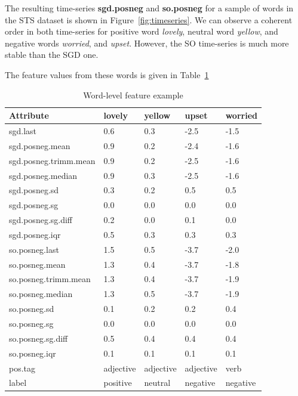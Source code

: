 \documentclass{sig-alternate}
\begin{document}
The resulting time-series \textbf{sgd.posneg} and \textbf{so.posneg} for a sample of words in the STS dataset is shown in Figure~\ref{fig:timeseries}. We can observe a coherent order in both time-series for positive word \emph{lovely}, neutral word \emph{yellow}, and  negative words \emph{worried}, and \emph{upset}. However, the SO time-series is much more stable than the SGD one. 


The feature values from these words is given in Table~\ref{fig:featex}

\begin{table}[ht]
\footnotesize
\centering
\begin{tabular}{l|llll}
  \hline
Attribute & lovely & yellow & upset & worried \\ 
  \hline
sgd.last &  0.6 &  0.3 & -2.5 & -1.5 \\ 
  sgd.posneg.mean &  0.9 &  0.2 & -2.4 & -1.6 \\ 
  sgd.posneg.trimm.mean &  0.9 &  0.2 & -2.5 & -1.6 \\ 
  sgd.posneg.median &  0.9 &  0.3 & -2.5 & -1.6 \\ 
  sgd.posneg.sd & 0.3 & 0.2 & 0.5 & 0.5 \\ 
  sgd.posneg.sg & 0.0 & 0.0 & 0.0 & 0.0 \\ 
  sgd.posneg.sg.diff & 0.2 & 0.0 & 0.1 & 0.0 \\ 
  sgd.posneg.iqr & 0.5 & 0.3 & 0.3 & 0.3 \\ 
  so.posneg.last &  1.5 &  0.5 & -3.7 & -2.0 \\ 
  so.posneg.mean &  1.3 &  0.4 & -3.7 & -1.8 \\ 
  so.posneg.trimm.mean &  1.3 &  0.4 & -3.7 & -1.9 \\ 
  so.posneg.median &  1.3 &  0.5 & -3.7 & -1.9 \\ 
  so.posneg.sd & 0.1 & 0.2 & 0.2 & 0.4 \\ 
  so.posneg.sg & 0.0 & 0.0 & 0.0& 0.0 \\ 
  so.posneg.sg.diff & 0.5 & 0.4 & 0.4 & 0.4 \\ 
  so.posneg.iqr & 0.1 & 0.1 & 0.1 & 0.1 \\ 
  pos.tag & adjective & adjective & adjective & verb \\ \hline
  label & positive & neutral & negative & negative \\ 
   \hline
\end{tabular}
\caption{Word-level feature example}
\label{fig:featex}
\end{table}
\end{document}
